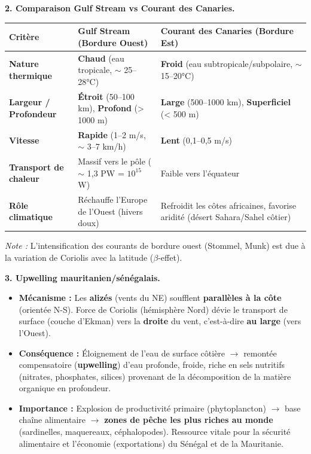 \documentclass[11pt]{article}
\begin{document}
\begin{exoresolu}
\textbf{2. Comparaison Gulf Stream vs Courant des Canaries.}
\begin{center}
\begin{tabularx}{\linewidth}{|l|X|X|}\hline
\textbf{Critère} & \textbf{Gulf Stream (Bordure Ouest)} & \textbf{Courant des Canaries (Bordure Est)} \\ \hline
\textbf{Nature thermique} & \textbf{Chaud} (eau tropicale, $\sim$ 25--28°C) & \textbf{Froid} (eau subtropicale/subpolaire, $\sim$ 15--20°C) \\ \hline
\textbf{Largeur / Profondeur} & \textbf{Étroit} (50--100 km), \textbf{Profond} (> 1000 m) & \textbf{Large} (500--1000 km), \textbf{Superficiel} (< 500 m) \\ \hline
\textbf{Vitesse} & \textbf{Rapide} (1--2 m/s, $\sim$ 3--7 km/h) & \textbf{Lent} (0,1--0,5 m/s) \\ \hline
\textbf{Transport de chaleur} & Massif vers le pôle ($\sim$ 1,3 PW = $10^{15}$ W) & Faible vers l'équateur \\ \hline
\textbf{Rôle climatique} & Réchauffe l'Europe de l'Ouest (hivers doux) & Refroidit les côtes africaines, favorise aridité (désert Sahara/Sahel côtier) \\ \hline
\end{tabularx}
\end{center}
\textit{Note :} L'intensification des courants de bordure ouest (Stommel, Munk) est due à la variation de Coriolis avec la latitude ($\beta$-effet).

\textbf{3. Upwelling mauritanien/sénégalais.}
\begin{itemize}
    \item \textbf{Mécanisme :} Les \textbf{alizés} (vents du NE) soufflent \textbf{parallèles à la côte} (orientée N-S). Force de Coriolis (hémisphère Nord) dévie le transport de surface (couche d'Ekman) vers la \textbf{droite} du vent, c'est-à-dire \textbf{au large} (vers l'Ouest).
    \item \textbf{Conséquence :} Éloignement de l'eau de surface côtière $\to$ remontée compensatoire (\textbf{upwelling}) d'eau profonde, froide, riche en sels nutritifs (nitrates, phosphates, silices) provenant de la décomposition de la matière organique en profondeur.
    \item \textbf{Importance :} Explosion de productivité primaire (phytoplancton) $\to$ base chaîne alimentaire $\to$ \textbf{zones de pêche les plus riches au monde} (sardinelles, maquereaux, céphalopodes). Ressource vitale pour la sécurité alimentaire et l'économie (exportations) du Sénégal et de la Mauritanie.
\end{itemize}


\end{exoresolu}
\end{document}
